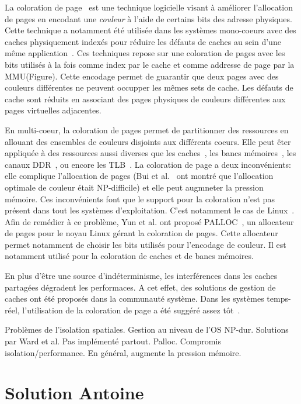 La coloration de page~\cite{taylor1990tlb} est une technique logicielle visant à améliorer l'allocation de pages en encodant une \emph{couleur} à l'aide de certains bits des adresse physiques.
Cette technique a notamment été utilisée dans les systèmes mono-coeurs avec des caches physiquement indexés pour réduire les défauts de caches au sein d'une même application~\cite{kessler1992page,1996_bugnion_Compiler_directed_page_coloring_for_multiprocessor,romer1994dynamic,sherwood1999reducing}.
Ces techniques repose sur une coloration de pages avec les bits utilisés à la fois comme index par le cache et comme addresse de page par la MMU(Figure).
Cette encodage permet de guarantir que deux pages avec des couleurs différentes ne peuvent occupper les mêmes sets de cache.
Les défauts de cache sont réduits en associant des pages physiques de couleurs différentes aux pages virtuelles adjacentes.

En multi-coeur, la coloration de pages permet de partitionner des ressources en allouant des ensembles de couleurs disjoints aux différents coeurs.
Elle peut êter appliquée à des ressources aussi diverses que les caches~\cite{ward2013outstanding,bui2008impact}, les bancs mémoires~\cite{yun2014palloc}, les canaux DDR~\cite{muralidhara_reducing_2011}, ou encore les TLB~\cite{panchamukhi_providing_2015}.
La coloration de page a deux inconvénients: elle complique l'allocation de pages (Bui et al.~\cite{bui2008impact} ont montré que l'allocation optimale de couleur était NP-difficile) et elle peut augmneter la pression mémoire.
Ces inconvénients font que le support pour la coloration n'est pas présent dans tout les systèmes d'exploitation.
C'est notamment le cas de Linux~\cite{}.
Afin de remédier à ce problème, Yun et al. ont proposé \textsc{PALLOC}~\cite{yun2014palloc}, un allocateur de pages pour le noyau Linux gérant la coloration de pages.
Cette allocateur permet notamment de choisir les bits utilisés pour l'encodage de couleur.
Il est notamment utilisé pour la coloration de caches et de bancs mémoires.

En plus d'être une source d'indéterminisme, les interférences dans les caches partagées dégradent les performaces.
A cet effet, des solutions de gestion de caches ont été proposés dans la communauté système.
Dans les systèmes temps-réel, l'utilisation de la coloration de page a été suggéré assez tôt~\cite{bui2008impact}.



Problèmes de l'isolation spatiales. Gestion au niveau de l'OS NP-dur. Solutions par Ward et al.
Pas implémenté partout. Palloc.
Compromis isolation/performance. En général, augmente la pression mémoire.

\section{Solution Antoine}